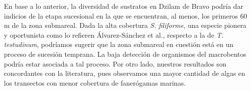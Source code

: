 \documentclass[
  authoryear,
  preprint,
  3p,
  twocolumn]{elsarticle}
\begin{document}
En base a lo anterior, la diversidad de sustratos en Dzilam de Bravo
podría dar indicios de la etapa sucesional en la que se encuentran, al
menos, los primeros 60 m de la zona submareal. Dada la alta cobertura
\emph{S. filiforme}, una especie pionera y oportunista como lo refieren
Álvarez-Sánchez et al.\citep{sanchez2021cobertura}, respecto a la de
\emph{T. testudinum}, podríamos sugerir que la zona submareal en
cuestión está en un proceso de sucesión temprana. La baja detección de
organismos del macrobentos podría estar asociada a tal proceso. Por otro
lado, nuestros resultados son concordantes con la
literatura\citep{sanchez2021cobertura}, pues observamos una mayor
cantidad de algas en los transectos con menor cobertura de fanerógamas
marinas.


\renewcommand\refname{References}
  
\end{document}
